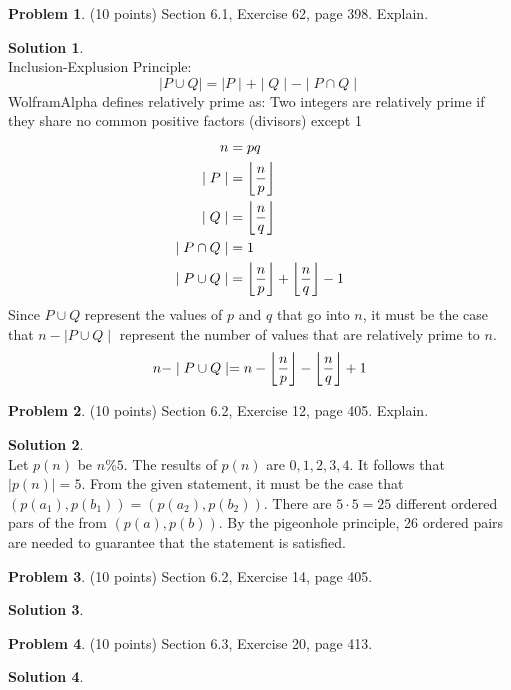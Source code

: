 \documentclass{article}
\DeclarePairedDelimiter\floor{\lfloor}{\rfloor}
\theoremstyle{definition}
\newtheorem{problem}{Problem}
\newtheorem*{solution}{Solution}
\begin{document}
\begin{problem} (10 points) 
Section 6.1, Exercise 62, page 398.  Explain.
\end{problem}
\begin{solution}\ \\
Inclusion-Explusion Principle:
$$\mid P \cup Q \mid = \mid P \mid + \mid Q \mid - \mid P \cap Q \mid$$
WolframAlpha defines relatively prime as: Two integers are relatively prime if they share no common positive factors (divisors) except 1
\begin{align*}
  n &= pq\\
  \mid P \mid &= \floor*{\dfrac{n}{p}} \\
  \mid Q \mid &= \floor*{\dfrac{n}{q}} \\
  \mid P \cap Q \mid &= 1 \\
  \mid P \cup Q \mid &= \floor*{\dfrac{n}{p}} + \floor*{\dfrac{n}{q}} - 1
\end{align*}
Since $P \cup Q$ represent the values of $p$ and $q$ that go into $n$, it must be the case that $n - \mid P \cup Q \mid$ represent the number of values that are relatively prime to $n$.
$$ n - \mid P \cup Q \mid = n - \floor*{\dfrac{n}{p}} - \floor*{\dfrac{n}{q}} + 1$$
\end{solution}

\begin{problem} (10 points) 
Section 6.2, Exercise 12, page 405.  Explain.
\end{problem}
\begin{solution} \ \\
Let $p(n)$ be $n \% 5$. The results of $p(n)$ are $0,1,2,3,4$. It follows that $\mid p(n) \mid = 5$. From the given statement, it must be the case that $(p(a_1),p(b_1)) = (p(a_2),p(b_2))$. There are $5\cdot 5 = 25$ different ordered pars of the from $(p(a),p(b))$. By the pigeonhole principle, 26 ordered pairs are needed to guarantee that the statement is satisfied.
\end{solution}

\begin{problem} (10 points) 
Section 6.2, Exercise 14, page 405.
\end{problem}
\begin{solution} 
\end{solution}

\begin{problem} (10 points) 
Section 6.3, Exercise 20, page 413.
\end{problem}
\begin{solution} 
\end{solution}
\end{document}
